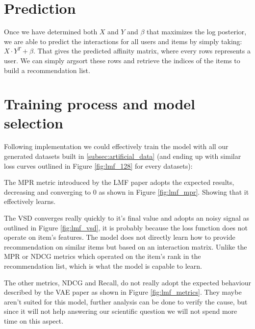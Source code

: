 \section{Prediction}
Once we have determined both $X$ and $Y$ and $\beta$ that maximizes the log posterior, we are able to predict the interactions for all users and items by simply taking: $X \cdot Y^T + \beta$. That gives the predicted affinity matrix, where every rows represents a user. We can simply argsort these rows and retrieve the indices of the items to build a recommendation list.

\section{Training process and model selection} \label{sec:lmf_train}
Following \cite{implicit-mf} implementation we could effectively train the model with all our generated datasets built in \ref{subsec:artificial_data} (and ending up with similar loss curves outlined in Figure \ref{fig:lmf_128} for every datasets):

The MPR metric introduced by the LMF paper adopts the expected results, decreasing and converging to 0 as shown in Figure \ref{fig:lmf_mpr}. Showing that it effectively learns.

The VSD converges really quickly to it's final value and adopts an noisy signal as outlined in Figure \ref{fig:lmf_vsd}, it is probably because the loss function does not operate on item's features. The model does not directly learn how to provide recommendation on similar items but based on an interaction matrix. Unlike the MPR or NDCG metrics which operated on the item's rank in the recommendation list, which is what the model is capable to learn.

\newpage

The other metrics, NDCG and Recall, do not really adopt the expected behaviour described by the VAE paper as shown in Figure \ref{fig:lmf_metrics}. They maybe aren't suited for this model, further analysis can be done to verify the cause, but since it will not help answering our scientific question we will not spend more time on this aspect.

